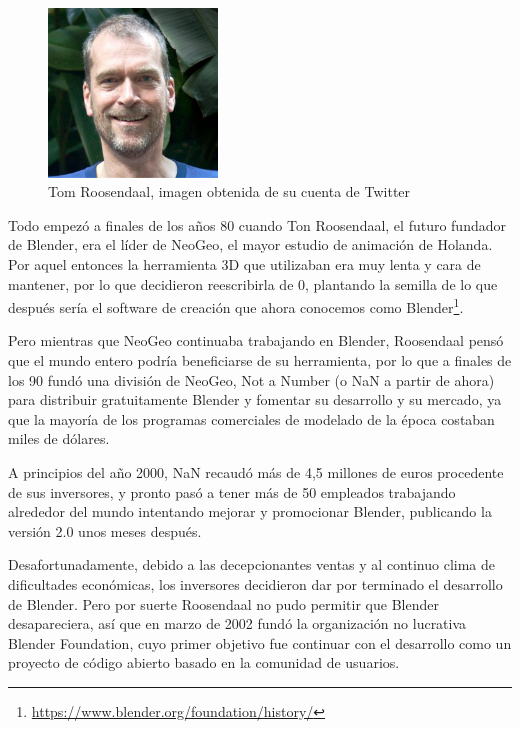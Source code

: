 \begin{figure}[!h]
\begin{center}
\includegraphics[width=0.4\textwidth]{imagenes/2/roosendaal.jpg}
\caption{Tom Roosendaal, imagen obtenida de su cuenta de Twitter}
\label{fig:roosendaal}
\end{center}
\end{figure}

Todo empezó a finales de los años 80 cuando Ton Roosendaal, el futuro fundador de Blender, era el líder de NeoGeo, el mayor estudio de animación de Holanda. Por aquel entonces la herramienta 3D que utilizaban era muy lenta y cara de mantener, por lo que decidieron reescribirla de 0, plantando la semilla de lo que después sería el software de creación que ahora conocemos como Blender\footnote{\url{https://www.blender.org/foundation/history/}}. 

Pero mientras que NeoGeo continuaba trabajando en Blender, Roosendaal pensó que el mundo entero podría beneficiarse de su herramienta, por lo que a finales de los 90 fundó una división de NeoGeo, Not a Number (o NaN a partir de ahora) para distribuir gratuitamente Blender y fomentar su desarrollo y su mercado, ya que la mayoría de los programas comerciales de modelado de la época costaban miles de dólares.

A principios del año 2000, NaN recaudó más de 4,5 millones de euros procedente de sus inversores, y pronto pasó a tener más de 50 empleados trabajando alrededor del mundo intentando mejorar y promocionar Blender, publicando la versión 2.0 unos meses después.

Desafortunadamente, debido a las decepcionantes ventas y al continuo clima de dificultades económicas, los inversores decidieron dar por terminado el desarrollo de Blender. Pero por suerte Roosendaal no pudo permitir que Blender desapareciera, así que en marzo de 2002 fundó la organización no lucrativa Blender Foundation, cuyo primer objetivo fue continuar con el desarrollo como un proyecto de código abierto basado en la comunidad de usuarios.

